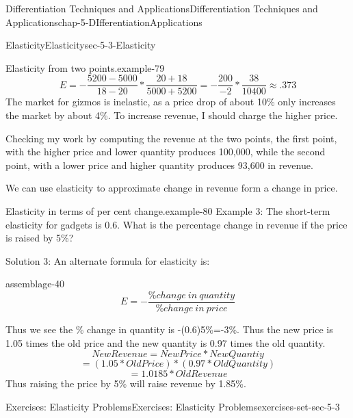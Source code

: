 \documentclass[oneside,10pt,]{book}
\numberwithin{equation}{section}
\begin{document}
\begin{chapterptx}{Differentiation Techniques and Applications}{}{Differentiation Techniques and Applications}{}{}{chap-5-DIfferentiationApplications}
\begin{sectionptx}{Elasticity}{}{Elasticity}{}{}{sec-5-3-Elasticity}
\begin{example}{Elasticity from two points.}{example-79}
%
\begin{equation*}
E=-\frac{5200-5000}{18-20}*\frac{20+18}{5000+5200} =-\frac{200}{-2}*\frac{38}{10400}\approx.373
\end{equation*}
\hypertarget{p-2055}{}%
The market for gizmos is inelastic, as a price drop of about 10\% only increases the market by about 4\%.  To increase revenue, I should charge the higher price.%
\end{example}
\hypertarget{p-2056}{}%
Checking my work by computing the revenue at the two points, the first point, with the higher price and lower quantity produces \textdollar{}100,000, while the second point, with a lower price and higher quantity produces \textdollar{}93,600 in revenue.%
\par
\hypertarget{p-2057}{}%
We can use elasticity to approximate change in revenue form a change in price.%
\begin{example}{Elasticity in terms of per cent change.}{example-80}%
\hypertarget{p-2058}{}%
Example 3: The short-term elasticity for gadgets is 0.6.  What is the percentage change in revenue if the price is raised by 5\%?%
\par
\hypertarget{p-2059}{}%
Solution 3: An alternate formula for elasticity is:%
\begin{assemblage}{}{assemblage-40}%
\hypertarget{p-2060}{}%
%
\begin{equation*}
E=-\frac{\% change\ in\ quantity}
{\% change\ in\ price}
\end{equation*}
%
\end{assemblage}
\hypertarget{p-2061}{}%
Thus we see the \% change in quantity is -(0.6)\textasteriskcentered{}5\%=-3\%.  Thus the new price is 1.05 times the old price and the new quantity is 0.97 times the old quantity.%
%
\begin{equation*}
NewRevenue=NewPrice*NewQuantiy
\end{equation*}
%
\begin{equation*}
=(1.05*OldPrice)*(0.97*OldQuantity)
\end{equation*}
%
\begin{equation*}
=1.0185*OldRevenue
\end{equation*}
\hypertarget{p-2062}{}%
Thus raising the price by 5\% will raise revenue by 1.85\%.%
\end{example}
%
%
\typeout{************************************************}
\typeout{************************************************}
%
\begin{exercises-subsection-numberless}{Exercises: Elasticity Problems}{}{Exercises: Elasticity Problems}{}{}{exercises-set-sec-5-3}

\end{exercises-subsection-numberless}
\end{sectionptx}
\end{chapterptx}
\end{document}
